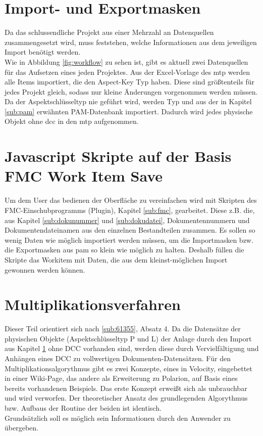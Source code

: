 \section{Import- und Exportmasken}
\label{sec:import}
Da das schlussendliche Projekt aus einer Mehrzahl an Datenquellen zusammengesetzt wird, muss feststehen, welche Informationen aus dem jeweiligen Import benötigt werden.\\
Wie in Abbildung \ref{fig:workflow} zu sehen ist, gibt es aktuell zwei Datenquellen für das Aufsetzen eines jeden Projektes.
Aus der Excel-Vorlage des \ac{mtp} werden alle Items importiert, die den Aspect-Key Typ  haben. Diese sind größtenteils für jedes Projekt gleich, sodass nur kleine Änderungen vorgenommen werden müssen. \\
Da der Aspektschlüsseltyp  nie geführt wird, werden Typ  und  aus der in Kapitel \ref{sub:pam} erwähnten PAM-Datenbank importiert. Dadurch wird jedes physische Objekt ohne \ac{dcc} in den \ac{mtp} aufgenommen.
\section{Javascript Skripte auf der Basis FMC Work Item Save}
\label{sec:javascripte}
Um dem User das bedienen der Oberfläche zu vereinfachen wird mit Skripten des FMC-Einschubprogramms (Plugin), Kapitel \ref{sub:fmc}, gearbeitet. Diese  z.B. die, aus Kapitel \ref{sub:dokunummer} und \ref{sub:dokudatei}, Dokumentennummern und Dokumentendateinamen aus den einzelnen Bestandteilen zusammen. Es sollen so wenig Daten wie möglich importiert werden müssen, um die Importmasken bzw. die Exportmasken aus \ac{pam} so klein wie möglich zu halten. Deshalb füllen die Skripte das Workitem mit Daten, die aus dem kleinst-möglichen Import gewonnen werden können.

\section{Multiplikationsverfahren}
\label{sec:multi}
Dieser Teil orientiert sich nach \ref{sub:61355}, Absatz 4.
Da die Datensätze der physischen Objekte (Aspektschlüsseltyp P und L) der Anlage durch den Import aus Kapitel \ref{sec:import} ohne DCC vorhanden sind, werden diese durch Vervielfältigung und Anhängen eines DCC zu vollwertigen Dokumenten-Datensätzen.
Für den Multiplikationsalgorythmus gibt es zwei Konzepte, eines in Velocity, eingebettet in einer Wiki-Page, das andere als Erweiterung zu Polarion, auf Basis eines bereits vorhandenen Beispiels. Das erste Konzept erweißt sich als unbrauchbar und wird verworfen. Der theoretischer Ansatz des grundlegenden Algorythmus bzw. Aufbaus der Routine der beiden ist identisch.\\
Grundsätzlich soll es möglich sein Informationen durch den Anwender zu übergeben.
